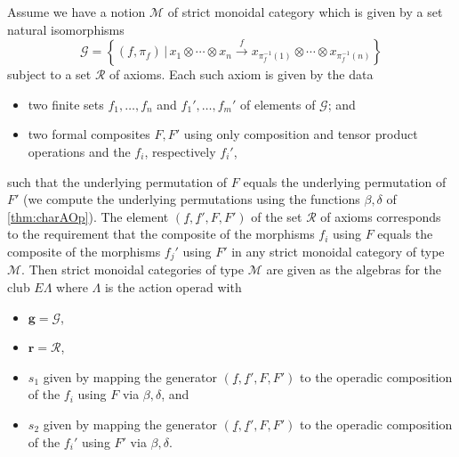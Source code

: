 \begin{cor}\label{pres2}
Assume we have a notion $\mathcal{M}$ of strict monoidal category which is given by  a set natural isomorphisms
  \[
    \mathcal{G} = \left\{ (f, \pi_{f}) \, | \,  x_{1} \otimes \cdots \otimes x_{n} \stackrel{f}{\longrightarrow} x_{\pi_{f}^{-1}(1)} \otimes \cdots \otimes x_{\pi_{f}^{-1}(n)} \right\}
  \]
subject to a set $\mathcal{R}$ of axioms. Each such axiom is given by the data
\begin{itemize}
  \item two finite sets $f_{1}, \ldots, f_{n}$ and $f_{1}', \ldots, f_{m}'$ of elements of $\mathcal{G}$; and
  \item two formal composites $F,F'$ using only composition and tensor product operations and the $f_{i}$, respectively $f_{i}'$, 
\end{itemize}
such that the underlying permutation of $F$ equals the underlying permutation of $F'$ (we compute the underlying permutations using the functions $\beta, \delta$ of \cref{thm:charAOp}). The element $\left(\underline{f}, \underline{f}', F, F'\right)$ of the set $\mathcal{R}$ of axioms corresponds to the requirement that the composite of the morphisms $f_{i}$ using $F$ equals the composite of the morphisms $f_{j}'$ using $F'$ in any strict monoidal category of type $\mathcal{M}$. Then strict monoidal categories of type $\mathcal{M}$ are given as the algebras for the club $E\Lambda$ where $\Lambda$ is the action operad with
\begin{itemize}
  \item $\mathbf{g} = \mathcal{G}$,
  \item $\mathbf{r} = \mathcal{R}$,
  \item $s_{1}$ given by mapping the generator $\left(\underline{f}, \underline{f}', F, F'\right)$ to the operadic composition of the $f_{i}$ using $F$ via $\beta, \delta$, and
  \item $s_{2}$ given by mapping the generator $\left(\underline{f}, \underline{f}', F, F'\right)$ to the operadic composition of the $f_{i}'$ using $F'$ via $\beta, \delta$.
\end{itemize}
\end{cor}

